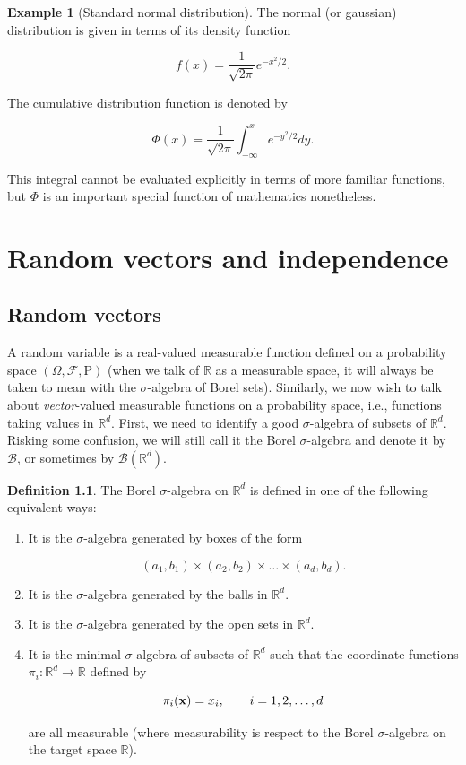 \documentclass[11pt]{report}
\providecommand{\cal}{\mathcal}
\newcommand{\R}{\mathbb{R}}
\theoremstyle{plain}
\theoremstyle{definition}
\newtheorem{defn}[thm]{Definition}
\newtheorem{example}[thm]{Example}
\begin{document}
\begin{example}[Standard normal distribution]
The normal (or gaussian) distribution is given in
terms of its density function

\[
f(x) = \frac{1}{\sqrt{2\pi}} e^{-x^2/2}.
\]

\noindent The cumulative distribution function is denoted by

\[
\Phi(x) = \frac{1}{\sqrt{2\pi}} \int_{-\infty}^x e^{-y^2/2} dy.
\]

\noindent This integral cannot be evaluated explicitly in terms
of more familiar functions, but $\Phi$ is an
important special function of mathematics nonetheless.
\end{example}

\chapter{Random vectors and independence}

\section{Random vectors}

A random variable is a real-valued measurable
function defined on a probability space
$(\Omega, {\cal F}, \mathrm{P})$ (when we talk of $\R$
as a measurable space, it will always be taken to mean
with the $\sigma$-algebra of Borel sets). Similarly,
we now wish to talk about \emph{vector}-valued measurable
functions on a probability space, i.e., functions
taking values in $\R^d$. First, we need to identify a
good $\sigma$-algebra of subsets of $\R^d$. Risking
some confusion, we will still call it the Borel
$\sigma$-algebra and denote it by ${\cal B}$, or
sometimes by ${\cal B}(\R^d)$.

\begin{defn}
\label{defi-borelrd}
The Borel $\sigma$-algebra on $\R^d$ is defined in
one of the following equivalent ways:

\begin{enumerate}[label=(\roman*)]
\item It is the $\sigma$-algebra generated by boxes of the
form

\[
(a_1,b_1) \times (a_2,b_2) \times \ldots \times (a_d,b_d).
\]

\item It is the $\sigma$-algebra generated by the balls in
$\R^d$.

\item It is the $\sigma$-algebra generated by the open sets
in $\R^d$.

\item It is the minimal $\sigma$-algebra of subsets of
$\R^d$ such that the coordinate functions
$\pi_i:\R^d\to\R$ defined by

\[
\pi_i({\bf x}) = x_i, \qquad i=1,2,\ldots,d
\]

\noindent are all measurable (where measurability is respect to
the Borel $\sigma$-algebra on the target space $\R$).
\end{enumerate}

\end{defn}
\end{document}
